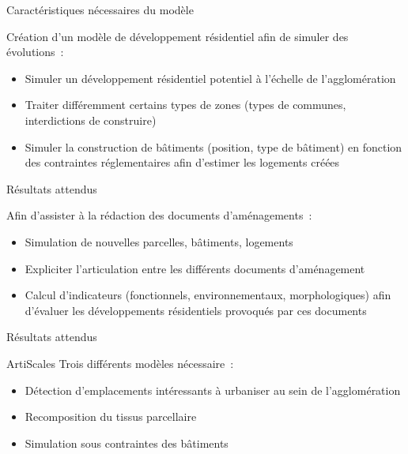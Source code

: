 \documentclass[xcolor=table]{beamer}
\begin{document}
\begin{frame}{Caractéristiques nécessaires du modèle}
\begin{block}{}
	Création d'un modèle de développement résidentiel afin de simuler des évolutions~:
	\begin{itemize}
		\item Simuler un développement résidentiel potentiel à l'échelle de l'agglomération 
		\item Traiter différemment certains types de zones (types de communes, interdictions de construire)
		\item Simuler la construction de bâtiments (position, type de bâtiment) en fonction des contraintes réglementaires afin d'estimer les logements créées 
	\end{itemize}
\end{block}
\end{frame}

\begin{frame}{Résultats attendus}
\begin{block}{}
Afin d'assister à la rédaction des documents d'aménagements~:
\begin{itemize}
	\item Simulation de nouvelles parcelles, bâtiments, logements 
	\item Expliciter l'articulation entre les différents documents d'aménagement
	\item Calcul d'indicateurs (fonctionnels, environnementaux, morphologiques) afin d'évaluer les développements résidentiels provoqués par ces documents
\end{itemize}
\end{block}
\end{frame}

\begin{frame}{Résultats attendus}


\end{frame}


\begin{frame}{ArtiScales}
	Trois différents modèles nécessaire~:
	\begin{itemize}
		\item Détection d'emplacements intéressants à urbaniser au sein de l'agglomération
		\item Recomposition du tissus parcellaire
		\item Simulation sous contraintes des bâtiments
	\end{itemize}
\end{frame}
\end{document}
